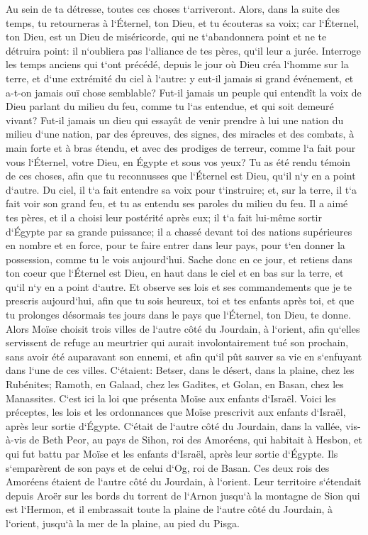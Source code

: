 \verse Au sein de ta détresse, toutes ces choses t`arriveront. Alors, dans la suite des temps, tu retourneras à l`Éternel, ton Dieu, et tu écouteras sa voix; 
\verse car l`Éternel, ton Dieu, est un Dieu de miséricorde, qui ne t`abandonnera point et ne te détruira point: il n`oubliera pas l`alliance de tes pères, qu`il leur a jurée. 
\verse Interroge les temps anciens qui t`ont précédé, depuis le jour où Dieu créa l`homme sur la terre, et d`une extrémité du ciel à l`autre: y eut-il jamais si grand événement, et a-t-on jamais ouï chose semblable? 
\verse Fut-il jamais un peuple qui entendît la voix de Dieu parlant du milieu du feu, comme tu l`as entendue, et qui soit demeuré vivant? 
\verse Fut-il jamais un dieu qui essayât de venir prendre à lui une nation du milieu d`une nation, par des épreuves, des signes, des miracles et des combats, à main forte et à bras étendu, et avec des prodiges de terreur, comme l`a fait pour vous l`Éternel, votre Dieu, en Égypte et sous vos yeux? 
\verse Tu as été rendu témoin de ces choses, afin que tu reconnusses que l`Éternel est Dieu, qu`il n`y en a point d`autre. 
\verse Du ciel, il t`a fait entendre sa voix pour t`instruire; et, sur la terre, il t`a fait voir son grand feu, et tu as entendu ses paroles du milieu du feu. 
\verse Il a aimé tes pères, et il a choisi leur postérité après eux; il t`a fait lui-même sortir d`Égypte par sa grande puissance; 
\verse il a chassé devant toi des nations supérieures en nombre et en force, pour te faire entrer dans leur pays, pour t`en donner la possession, comme tu le vois aujourd`hui. 
\verse Sache donc en ce jour, et retiens dans ton coeur que l`Éternel est Dieu, en haut dans le ciel et en bas sur la terre, et qu`il n`y en a point d`autre. 
\verse Et observe ses lois et ses commandements que je te prescris aujourd`hui, afin que tu sois heureux, toi et tes enfants après toi, et que tu prolonges désormais tes jours dans le pays que l`Éternel, ton Dieu, te donne. 
\verse Alors Moïse choisit trois villes de l`autre côté du Jourdain, à l`orient, 
\verse afin qu`elles servissent de refuge au meurtrier qui aurait involontairement tué son prochain, sans avoir été auparavant son ennemi, et afin qu`il pût sauver sa vie en s`enfuyant dans l`une de ces villes. 
\verse C`étaient: Betser, dans le désert, dans la plaine, chez les Rubénites; Ramoth, en Galaad, chez les Gadites, et Golan, en Basan, chez les Manassites. 
\verse C`est ici la loi que présenta Moïse aux enfants d`Israël. 
\verse Voici les préceptes, les lois et les ordonnances que Moïse prescrivit aux enfants d`Israël, après leur sortie d`Égypte. 
\verse C`était de l`autre côté du Jourdain, dans la vallée, vis-à-vis de Beth Peor, au pays de Sihon, roi des Amoréens, qui habitait à Hesbon, et qui fut battu par Moïse et les enfants d`Israël, après leur sortie d`Égypte. 
\verse Ils s`emparèrent de son pays et de celui d`Og, roi de Basan. Ces deux rois des Amoréens étaient de l`autre côté du Jourdain, à l`orient. 
\verse Leur territoire s`étendait depuis Aroër sur les bords du torrent de l`Arnon jusqu`à la montagne de Sion qui est l`Hermon, 
\verse et il embrassait toute la plaine de l`autre côté du Jourdain, à l`orient, jusqu`à la mer de la plaine, au pied du Pisga. 

